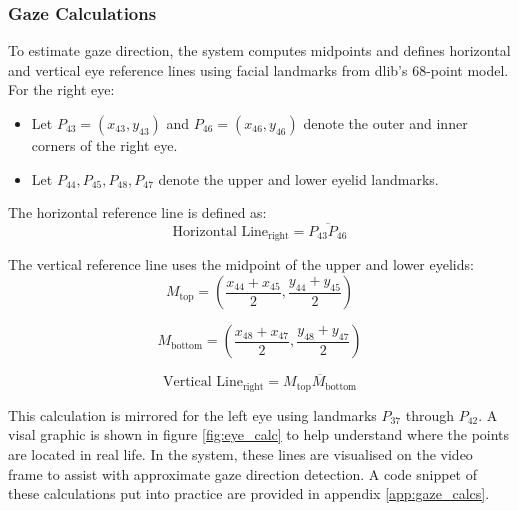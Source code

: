 \documentclass[12pt]{article}
\theoremstyle{plain}
\theoremstyle{definition}
\begin{document}
\subsubsection{Gaze Calculations}

To estimate gaze direction, the system computes midpoints and defines horizontal and vertical eye reference lines using facial landmarks from dlib's 68-point model. For the right eye:

\begin{itemize}

    \item Let \( P_{43} = (x_{43}, y_{43}) \) and \( P_{46} = (x_{46}, y_{46}) \) denote the outer and inner corners of the right eye.

    \item Let \( P_{44}, P_{45}, P_{48}, P_{47} \) denote the upper and lower eyelid landmarks.

\end{itemize}
The horizontal reference line is defined as:
\[
\text{Horizontal Line}_{\text{right}} = \overline{P_{43}P_{46}}
\]

The vertical reference line uses the midpoint of the upper and lower eyelids:
\[
M_{\text{top}} = \left( \frac{x_{44} + x_{45}}{2}, \frac{y_{44} + y_{45}}{2} \right)
\]

\[
M_{\text{bottom}} = \left( \frac{x_{48} + x_{47}}{2}, \frac{y_{48} + y_{47}}{2} \right)
\]

\[
\text{Vertical Line}_{\text{right}} = \overline{M_{\text{top}}M_{\text{bottom}}}
\]

This calculation is mirrored for the left eye using landmarks \( P_{37} \) through \( P_{42} \). A visal graphic is shown in figure \ref{fig:eye_calc} to help understand where the points are located in real life. In the system, these lines are visualised on the video frame to assist with approximate gaze direction detection. A code snippet of these calculations put into practice are provided in appendix \ref{app:gaze_calcs}.
\end{document}
